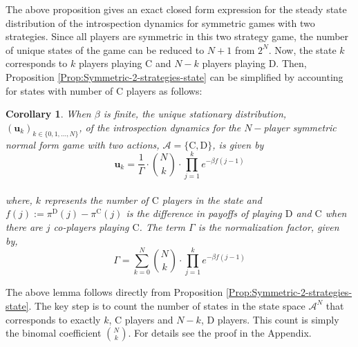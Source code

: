 \documentclass[11pt]{article}
\theoremstyle{plainCl1}
\theoremstyle{plainCl2}
\newtheorem{Corollary}{Corollary}
\newcommand{\ubf}{\mathbf{u}}
\newcommand{\C}{\mathrm{C}}
\newcommand{\D}{\mathrm{D}}
\begin{document}
\noindent The above proposition gives an exact closed form expression for the steady state distribution of the introspection dynamics for symmetric games with two strategies. Since all players are symmetric in this two strategy game, the number of unique states of the game can be reduced to $N+1$ from $2^N$. Now, the state $k$ corresponds to $k$ players playing $\C$ and $N-k$ players playing $\D$. Then, Proposition \ref{Prop:Symmetric-2-strategies-state} can be simplified by accounting for states with number of $\C$ players as follows:


\begin{Corollary}
\label{Lemma: Symmetric-2-stg}
When $\beta$ is finite, the unique stationary distribution, $(\ubf_k)_{k \in \{0,1,...,N\}}$, of the introspection dynamics for the $N-$player symmetric normal form game with two actions, $\mathcal{A} = \{\C, \D \}$, is given by \\
\begin{equation}
\label{Eq:stationary-dist-symm-2-stgs}
\ubf_k = \frac{1}{\Gamma} \cdot {N \choose k} \cdot \displaystyle \prod_{j=1}^{k} \displaystyle e^{-\beta f(j-1)}
\end{equation} \\ 
where, $k$ represents the number of $\C$ players in the state and $f(j) := \pi^\D(j) - \pi^\C(j)$ is the difference in payoffs of playing $\D$ and $\C$ when there are $j$ co-players playing $\C$. The term $\Gamma$ is the normalization factor, given by, \\
\begin{equation}
\label{Eq:normalization-Tk}
\Gamma = \displaystyle \sum_{k=0}^N {N \choose k} \cdot \displaystyle \prod_{j=1}^{k} \displaystyle e^{-\beta f(j-1)}
\end{equation}
\end{Corollary}
\noindent The above lemma follows directly from Proposition \ref{Prop:Symmetric-2-strategies-state}. The key step is to count the number of states in the state space $\mathcal{A}^N$ that corresponds to exactly $k$, $\C$ players and $N-k$, $\D$ players. This count is simply the binomal coefficient $N \choose k$. For details see the proof in the Appendix. 
\newpage 
\end{document}
